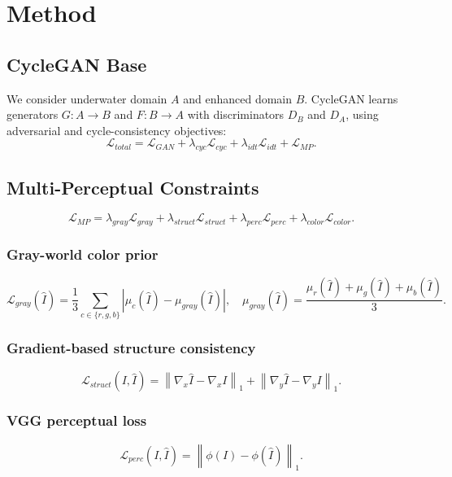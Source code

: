 \documentclass{IEEEtran}
\begin{document}
\section{Method}
\subsection{CycleGAN Base}
We consider underwater domain $A$ and enhanced domain $B$. CycleGAN learns generators $G: A\rightarrow B$ and $F: B\rightarrow A$ with discriminators $D_B$ and $D_A$, using adversarial and cycle-consistency objectives:
\begin{equation}
\mathcal{L}_{total}=\mathcal{L}_{GAN}+\lambda_{cyc}\mathcal{L}_{cyc}+\lambda_{idt}\mathcal{L}_{idt}+\mathcal{L}_{MP}.
\end{equation}
\subsection{Multi-Perceptual Constraints}
\begin{equation}
\mathcal{L}_{MP}=\lambda_{gray}\mathcal{L}_{gray}+\lambda_{struct}\mathcal{L}_{struct}+\lambda_{perc}\mathcal{L}_{perc}+\lambda_{color}\mathcal{L}_{color}.
\end{equation}
\subsubsection{Gray-world color prior}
\begin{equation}
\mathcal{L}_{gray}(\hat{I})=\frac{1}{3}\sum_{c\in\{r,g,b\}}\left|\mu_c(\hat{I})-\mu_{gray}(\hat{I})\right|,\quad
\mu_{gray}(\hat{I})=\frac{\mu_r(\hat{I})+\mu_g(\hat{I})+\mu_b(\hat{I})}{3}.
\end{equation}
\subsubsection{Gradient-based structure consistency}
\begin{equation}
\mathcal{L}_{struct}(I,\hat{I})=\left\|\nabla_x \hat{I}-\nabla_x I\right\|_1+\left\|\nabla_y \hat{I}-\nabla_y I\right\|_1.
\end{equation}
\subsubsection{VGG perceptual loss}
\begin{equation}
\mathcal{L}_{perc}(I,\hat{I})=\left\|\phi(I)-\phi(\hat{I})\right\|_1.
\end{equation}
\end{document}
